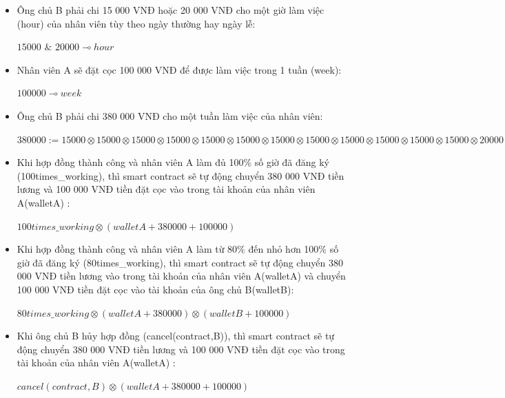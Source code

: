 \documentclass[12pt,a4paper,oneside]{article}
\begin{document}
\begin{itemize}
	\item Ông chủ B phải chi 15 000 VNĐ hoặc 20 000 VNĐ cho một giờ làm việc (hour) của nhân viên tùy theo ngày thường hay ngày lễ:
	\begin{center}
		$15000$ $\&$ $20000 \multimap hour$
	\end{center}
	
	\item Nhân viên A sẽ đặt cọc 100 000 VNĐ để được làm việc trong 1 tuần (week):
	\begin{center}
		$100000 \multimap week$
	\end{center}
	
	\item Ông chủ B phải chi 380 000 VNĐ cho một tuần làm việc của nhân viên:
	\begin{center}
		$380000 := 15000 \otimes 15000 \otimes 15000 \otimes 15000 \otimes15000 \otimes 15000 \otimes15000 \otimes 15000 \otimes 15000 \otimes 15000 \otimes15000 \otimes 15000 \otimes 20000 \otimes 20000 \otimes 20000 \otimes 20000 \otimes20000 \otimes 20000 \otimes20000 \otimes 20000 \otimes20000 \otimes 20000 \otimes $
	\end{center}
	
	\item Khi hợp đồng thành công và nhân viên A làm đủ 100\% số giờ đã đăng ký (100times\_working), thì smart contract sẽ tự động chuyển 380 000 VNĐ tiền lương và 100 000 VNĐ tiền đặt cọc vào trong tài khoản của nhân viên A(walletA) : 
	\begin{center}
		$100times\_working \otimes (walletA + 380 000 + 100 000) $
	\end{center}
	
	\item Khi hợp đồng thành công và nhân viên A làm từ 80\% đến nhỏ hơn 100\% số giờ đã đăng ký  (80times\_working), thì smart contract sẽ tự động chuyển 380 000 VNĐ tiền lương vào trong tài khoản của nhân viên A(walletA) và chuyển 100 000 VNĐ tiền đặt cọc  vào tài khoản của ông chủ B(walletB):
	\begin{center}
		$80times\_working \otimes (walletA + 380 000) \otimes (walletB + 100000) $
	\end{center}
	
	\item Khi ông chủ B hủy hợp đồng (cancel(contract,B)), thì smart contract sẽ tự động chuyển 380 000 VNĐ tiền lương và 100 000 VNĐ tiền đặt cọc vào trong tài khoản của nhân viên A(walletA) : 
	\begin{center}
		$cancel(contract,B)  \otimes (walletA + 380 000 + 100 000) $
	\end{center}
	

\end{itemize}
\end{document}
